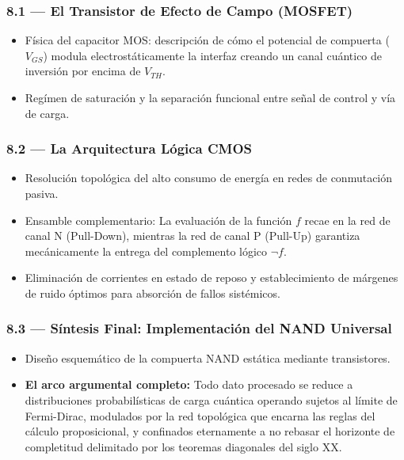 \documentclass[11pt, letterpaper]{article}
\begin{document}
\subsubsection{8.1 --- El Transistor de Efecto de Campo (MOSFET)}
\begin{itemize}
  \item F\'isica del capacitor MOS: descripci\'on de c\'omo el potencial de compuerta ($V_{GS}$) modula electrost\'aticamente la interfaz creando un canal cu\'antico de inversi\'on por encima de $V_{TH}$.
  \item Reg\'imen de saturaci\'on y la separaci\'on funcional entre se\~nal de control y v\'ia de carga.
\end{itemize}

\subsubsection{8.2 --- La Arquitectura L\'ogica CMOS}
\begin{itemize}
  \item Resoluci\'on topol\'ogica del alto consumo de energ\'ia en redes de conmutaci\'on pasiva.
  \item Ensamble complementario: La evaluaci\'on de la funci\'on $f$ recae en la red de canal N (Pull-Down), mientras la red de canal P (Pull-Up) garantiza mec\'anicamente la entrega del complemento l\'ogico $\neg f$. 
  \item Eliminaci\'on de corrientes en estado de reposo y establecimiento de m\'argenes de ruido \'optimos para absorci\'on de fallos sist\'emicos.
\end{itemize}

\subsubsection{8.3 --- S\'intesis Final: Implementaci\'on del NAND Universal}
\begin{itemize}
  \item Dise\~no esquem\'atico de la compuerta NAND est\'atica mediante transistores.
  \item \textbf{El arco argumental completo:} Todo dato procesado se reduce a distribuciones probabil\'isticas de carga cu\'antica operando sujetos al l\'imite de Fermi-Dirac, modulados por la red topol\'ogica que encarna las reglas del c\'alculo proposicional, y confinados eternamente a no rebasar el horizonte de completitud delimitado por los teoremas diagonales del siglo XX.
\end{itemize}
\end{document}
